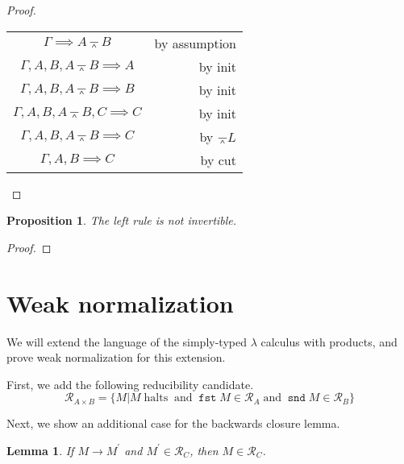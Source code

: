 \documentclass[letterpaper,11pt]{article}
\newtheorem{prop}{Proposition}
\newtheorem{lemma}{Lemma}
\newcommand{\seq}{\implies}
\newcommand{\step}{\rightarrow}
\newcommand{\R}{\mathcal{R}}
\newcommand{\nand}{\barwedge}
\DeclareMathOperator{\fst}{\mathtt{fst}}
\DeclareMathOperator{\snd}{\mathtt{snd}}
\begin{document}
\begin{proof} ~

    \begin{center}
        \begin{tabular}{c r}
            $\Gamma \seq A \nand B$
            &
            by assumption \\
            $\Gamma, A, B, A \nand B \seq A$
            &
            by init \\
            $\Gamma, A, B, A \nand B \seq B$
            &
            by init \\
            $\Gamma, A, B, A \nand B, C \seq C$
            &
            by init \\
            $\Gamma, A, B, A \nand B \seq C$
            &
            by $\nand L$ \\
            $\Gamma, A, B \seq C$
            &
            by cut
        \end{tabular}
    \end{center}
\end{proof}

\begin{prop}
    The left rule is not invertible.
\end{prop}

\begin{proof}
\end{proof}

\section{Weak normalization}

We will extend the language of the simply-typed $\lambda$ calculus with
products, and prove weak normalization for this extension.

First, we add the following reducibility candidate.
\begin{equation*}
    \mathcal{R}_{A \times B} = \{ M
        | M \;\text{halts}\;
        \;\text{and}\; \fst{M} \in \mathcal{R}_A
        \;\text{and}\; \snd{M} \in \mathcal{R}_B
    \}
\end{equation*}

Next, we show an additional case for the backwards closure lemma.

\begin{lemma}
    If $M \step M^\prime$ and $M^\prime \in \R_C$, then $M \in \R_C$.
\end{lemma}
\end{document}

